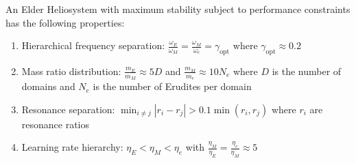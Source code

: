 \begin{theorem}
An Elder Heliosystem with maximum stability subject to performance constraints has the following properties:
\begin{enumerate}
    \item Hierarchical frequency separation: $\frac{\omega_E}{\omega_M} = \frac{\omega_M}{\omega_e} = \gamma_{\text{opt}}$ where $\gamma_{\text{opt}} \approx 0.2$
    \item Mass ratio distribution: $\frac{m_E}{m_M} \approx 5D$ and $\frac{m_M}{m_e} \approx 10N_e$ where $D$ is the number of domains and $N_e$ is the number of Erudites per domain
    \item Resonance separation: $\min_{i \neq j} |r_i - r_j| > 0.1 \min(r_i, r_j)$ where $r_i$ are resonance ratios
    \item Learning rate hierarchy: $\eta_E < \eta_M < \eta_e$ with $\frac{\eta_M}{\eta_E} = \frac{\eta_e}{\eta_M} \approx 5$
\end{enumerate}
\end{theorem}


